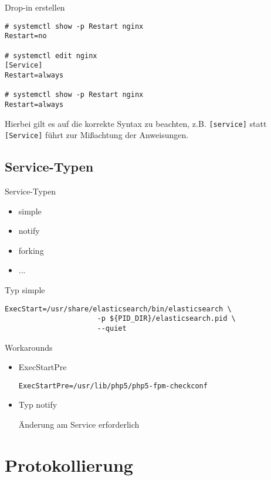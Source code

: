 \begin{frame}[fragile]{Drop-in erstellen}
	\begin{lstlisting}
# systemctl show -p Restart nginx
Restart=no

# systemctl edit nginx
[Service]
Restart=always

# systemctl show -p Restart nginx
Restart=always
\end{lstlisting}
\end{frame}

Hierbei gilt es auf die korrekte Syntax zu beachten, z.B. \verb|[service]| statt \verb|[Service]|
führt zur Mißachtung der Anweisungen.

\subsection{Service-Typen}

\begin{frame}{Service-Typen}
\begin{itemize}
\item simple
\item notify
\item forking
\item ...
\end{itemize}
\end{frame}

\begin{frame}[fragile]{Typ simple}
\begin{lstlisting}
ExecStart=/usr/share/elasticsearch/bin/elasticsearch \
                      -p ${PID_DIR}/elasticsearch.pid \
                      --quiet
\end{lstlisting}
\end{frame}

\begin{frame}[fragile]{Workarounds}
  \begin{itemize}
     \item ExecStartPre

\verb|ExecStartPre=/usr/lib/php5/php5-fpm-checkconf|

     \item Typ notify

	Änderung am Service erforderlich
  \end{itemize}
\end{frame}

\section{Protokollierung}

